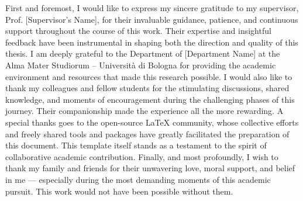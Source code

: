 First and foremost, I would like to express my sincere gratitude to my supervisor, Prof. [Supervisor's Name], for their invaluable guidance, patience, and continuous support throughout the course of this work. Their expertise and insightful feedback have been instrumental in shaping both the direction and quality of this thesis.
I am deeply grateful to the Department of [Department Name] at the Alma Mater Studiorum – Università di Bologna for providing the academic environment and resources that made this research possible.
I would also like to thank my colleagues and fellow students for the stimulating discussions, shared knowledge, and moments of encouragement during the challenging phases of this journey. Their companionship made the experience all the more rewarding.
A special thanks goes to the open-source LaTeX community, whose collective efforts and freely shared tools and packages have greatly facilitated the preparation of this document. This template itself stands as a testament to the spirit of collaborative academic contribution.
Finally, and most profoundly, I wish to thank my family and friends for their unwavering love, moral support, and belief in me — especially during the most demanding moments of this academic pursuit. This work would not have been possible without them.